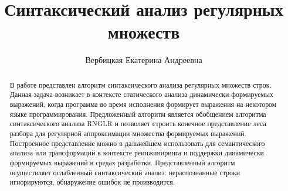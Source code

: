 
\title{Синтаксический анализ регулярных множеств}


\author{Вербицкая Екатерина Андреевна}



\maketitle             

\begin{abstract}
В работе представлен алгоритм синтаксического анализа регулярных 
множеств строк. Данная задача возникает в контексте статического анализа 
динамически формируемых выражений, когда программа во время исполнения формирует выражения на 
некотором языке программирования. Предложенный алгоритм является обобщением 
алгоритма синтаксического анализа RNGLR и позволяет строить конечное 
представление леса разбора для регулярной аппроксимации множества формируемых 
выражений. Построенное представление можно в дальнейшем использовать для 
семантического анализа или трансформаций в контексте реинжиниринга и поддержки 
динамически формируемых выражений в средах разработки. Представленный алгоритм 
осуществляет ослабленный синтаксический анализ: нераспознанные строки 
игнорируются, обнаружение ошибок не производится. 
\end{abstract}









